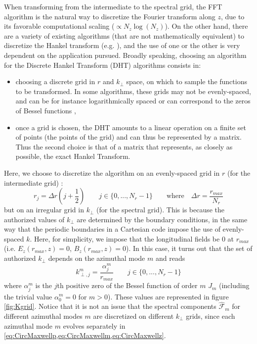 \documentclass[1p,times]{elsarticle}
\newcommand{\spectral}[1]{\hat{\mathcal{#1}}}
\begin{document}
When transforming from the intermediate to the spectral grid, the FFT
algorithm is the natural way to discretize the Fourier transform along $z$, due to its
favorable computational scaling ($\propto N_z\log(N_z)$).
On the other hand, there are a variety of existing algorithms (that are not mathematically
equivalent) to discretize the Hankel
transform (e.g. \citep{Cree,Yu,Siegman,Guizar,KaiMing}), and the use of one or the other
is very dependent on the application pursued. Broadly
speaking, choosing an algorithm for the Discrete Hankel Transform (DHT)
algorithms consists in:
\begin{itemize}
\item choosing a discrete grid in $r$ and $k_\perp$ space, on which to
  sample the functions to be transformed. In some algorithms, these
  grids may not be evenly-spaced, and can be for instance
  logarithmically spaced \citep{Siegman} or can correspond to the zeros of
  Bessel functions \citep{Yu,Guizar,KaiMing},
\item once a grid is chosen, the DHT amounts to a linear operation on a
  finite set of points (the points of the grid) and can thus be
  represented by a matrix. Thus the second choice is that of a matrix
  that represents, as closely as possible, the exact Hankel Transform.
\end{itemize}
Here, we choose to discretize the algorithm on an evenly-spaced grid in $r$
(for the intermediate grid) :
\begin{equation} 
r_j = \Delta r \left( j+\frac{1}{2} \right) \qquad  j \in \{0, ...,
N_r-1 \} \qquad \mathrm{where} \quad \Delta r = \frac{r_{max}}{N_r} 
\end{equation}
but on an irregular grid in $k_\perp$ (for the spectral grid). This is because the authorized
values of $k_\perp$ are determined by the boundary conditions, in the same way that
the periodic boundaries in a Cartesian code impose the use of
evenly-spaced $k$. Here, for simplicity, we impose that the
longitudinal fields be $0$ at $r_{max}$ (i.e. $E_z(r_{max}, z) = 0$,
$B_z(r_{max}, z) = 0$). In this case, it turns out that the set of authorized
$k_\perp$ depends on the azimuthal mode $m$ and reads
\begin{equation}  
k^m_{\perp,j} = \frac{\alpha_j^m}{r_{max}} \qquad j \in \{0, ...,
N_r-1 \}
\end{equation}
where $\alpha^m_j$ is the $j$th positive zero of the Bessel function of order
$m$ $J_m$ (including the trivial value $\alpha_0^m=0$ for
$m>0$). These values are represented in figure \ref{fig:Kgrid}. Notice
that it is not an issue that the spectral components $\spectral{F}_m$
for different azimuthal modes $m$ are discretized on different
$k_\perp$ grids, since each azimuthal mode $m$ evolves separately in
\cref{eq:CircMaxwellp,eq:CircMaxwellm,eq:CircMaxwellz}.
\end{document}
